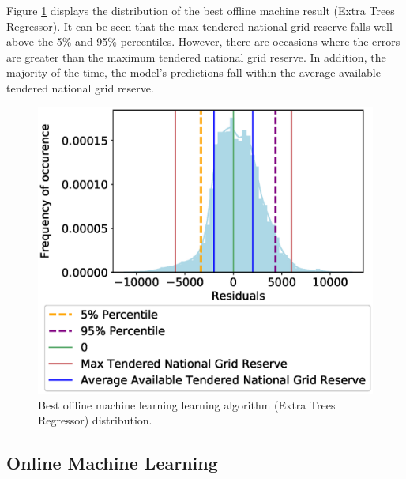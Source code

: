 \documentclass[final,3p,times,twocolumn,numbers]{elsarticle}
\begin{document}
Figure \ref{fig:best_offline_learning_day_distribution} displays the distribution of the best offline machine result (Extra Trees Regressor). It can be seen that the max tendered national grid reserve falls well above the 5\% and 95\% percentiles. However, there are occasions where the errors are greater than the maximum tendered national grid reserve. In addition, the majority of the time, the model's predictions fall within the average available tendered national grid reserve.

\begin{figure}
\centering
\includegraphics[width=\columnwidth,natwidth=500,natheight=500]{figures/results/ExtraTreesRegressor_distribution_plot.eps}
\caption{Best offline machine learning learning algorithm (Extra Trees Regressor) distribution.}
\label{fig:best_offline_learning_day_distribution}
\end{figure}


\subsection{Online Machine Learning}
\end{document}
